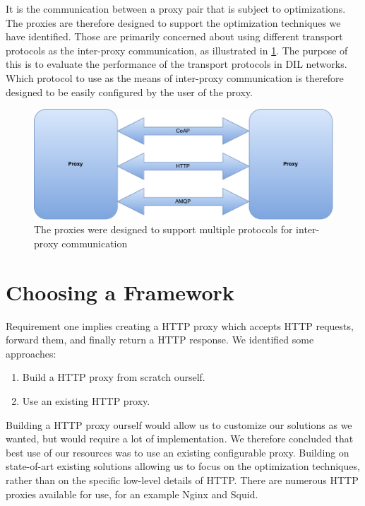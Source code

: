 It is the communication between a proxy pair that is subject to optimizations.
The proxies are therefore designed to support the optimization techniques we
have identified. Those are primarily concerned about using different transport
protocols as the inter-proxy communication, as illustrated in
\cref{figure:proxy-communication}. The purpose of this is to evaluate the
performance of the transport protocols in DIL networks. Which protocol to use as
the means of inter-proxy communication is therefore designed to be easily
configured by the user of the proxy.

\begin{figure}[h]
\includegraphics[scale=0.5]{images/proxy_communcation.pdf}
\caption{The proxies were designed to support multiple protocols for inter-proxy communication}
\label{figure:proxy-communication}
\end{figure}

\section{Choosing a Framework}

Requirement one implies creating a HTTP proxy which accepts HTTP requests,
forward them, and finally return a HTTP response. We identified some approaches:

\begin{enumerate}
    \item Build a HTTP proxy from scratch ourself.
    \item Use an existing HTTP proxy.
\end{enumerate}

Building a HTTP proxy ourself would allow us to customize our solutions as we
wanted, but would require a lot of implementation. We therefore concluded that
best use of our resources was to use an existing configurable proxy. Building on
state-of-art existing solutions allowing us to focus on the optimization
techniques, rather than on the specific low-level details of HTTP. There are
numerous HTTP proxies available for use, for an example Nginx and Squid.

